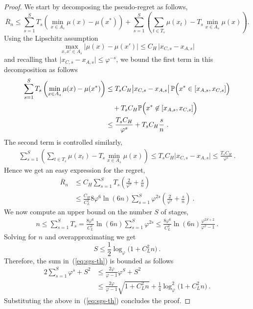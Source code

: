 \documentclass[11pt]{hackednow}
\renewcommand{\phi}{\varphi}
\renewcommand{\P}{\mathbb{P}}
\newcommand{\oR}{\overline{R}}
\begin{document}
\begin{proof}
We start by decomposing the pseudo-regret as follows,
$$\oR_n \leq \sum_{s=1}^S T_s \left(\min_{x \in A_s}\mu(x) - \mu(x^*)\right) + \sum_{s=1}^S \left( \sum_{t\in T_s} \mu(x_t) - T_s \min_{x \in A_s} \mu(x) \right) .$$
Using the Lipschitz assumption
\[
    \max_{x,x'\in A_s}\bigl|\mu(x)-\mu(x')\bigr| \le C_H\,\bigl|x_{C,s} - x_{A,s}\bigr|
\]
and recalling that $\bigl|x_{C,s} - x_{A,s}\bigr| \le \varphi^{-s}$, we bound the first term in this decomposition as follows
\begin{align*}
    \sum_{s=1}^S T_s \left(\min_{x \in A_s}\mu(x) - \mu(x^*)\right)
&\le
    T_s C_H \bigl|x_{C,s} - x_{A,s}\bigr| \, \P\Bigl(x^* \in [x_{A,s},x_{C,s}]\Bigr)
\\ &\quad
    + T_s C_H \P\Bigl(x^* \not\in [x_{A,s},x_{C,s}]\Bigr)
\\ &\le
    \frac{T_s C_H}{\varphi^s} + T_s C_H \frac{s}{n}~.
\end{align*}
The second term is controlled similarly,
\begin{align*}
    \sum_{s=1}^S \left( \sum_{t\in T_s} \mu(x_t) - T_s \min_{x \in A_s} \mu(x) \right)
\le
    T_s C_H \bigl|x_{C,s} - x_{A,s}\bigr|
\le
    \frac{T_s C_H}{\varphi^s}~.
\end{align*}
Hence we get an easy expression for the regret,
\begin{align}
\nonumber
    \oR_n
&\le
    C_H \sum_{s=1}^S T_s\left(\frac{2}{\varphi^s} + \frac{s}{n}\right)
\\& \le
\label{eq:sgs-th}
    \frac{C_H}{C_L^2}8\varphi^6\ln(6n) \sum_{s=1}^S \varphi^{2s}\left(\frac{2}{\varphi^s} + \frac{s}{n}\right)~.
\end{align}
We now compute an upper bound on the number $S$ of stages,
\begin{align*}
    n \le \sum_{s=1}^S T_s = \frac{8\varphi^6}{C_L^2}\ln(6n)\sum_{s=1}^S \varphi^{2s} \le \frac{8\varphi^6}{C_L^2}\ln(6n)\frac{\varphi^{2S+2}}{\varphi^2 - 1}~.
\end{align*}
Solving for $n$ and overapproximating we get
\[
    S \le \frac{1}{2}\log_{\phi}\bigl(1 + C_L^2 n\bigr)~.
\]
Therefore, the sum in~(\ref{eq:sgs-th}) is bounded as follows 
\begin{align*}
    2\sum_{s=1}^S \varphi^s + S^2
&\le
    \frac{2\varphi}{\varphi-1}\varphi^S + S^2
\\&\le
    \frac{2\varphi}{\varphi-1}\sqrt{1 + C_L^2 n} + \frac{1}{4}\log_{\phi}^2\bigl(1 + C_L^2 n\bigr)~.
\end{align*}
Substituting the above in~(\ref{eq:sgs-th}) concludes the proof.
\end{proof}
\end{document}
